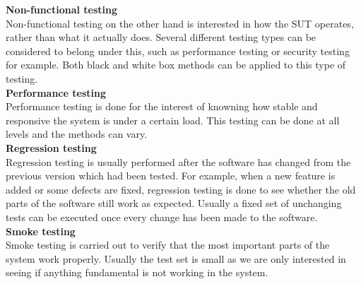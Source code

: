 \documentclass[english,12pt,a4paper,pdftex,elec,utf8]{aaltothesis}
\begin{document}
\textbf{Non-functional testing}\\
Non-functional testing on the other hand is interested in how the SUT operates, rather than what it actually does. Several different testing types can be considered to belong under this, such as performance testing or security testing for example. Both black and white box methods can be applied to this type of testing.\\ 
\textbf{Performance testing}\\
Performance testing is done for the interest of knowning how stable and responsive the system is under a certain load. This testing can be done at all levels and the methods can vary.\\ 
\textbf{Regression testing}\\
Regression testing is usually performed after the software has changed from the previous version which had been tested. For example, when a new feature is added or some defects are fixed, regression testing is done to see whether the old parts of the software still work as expected. Usually a fixed set of unchanging tests can be executed once every change has been made to the software.\\ 
\textbf{Smoke testing}\\
Smoke testing is carried out to verify that the most important parts of the system work properly. Usually the test set is small as we are only interested in seeing if anything fundamental is not working in the system.
\end{document}
